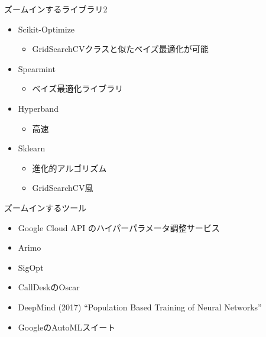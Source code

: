 \documentclass[aspectratio=169, dvipdfmx, 14pt, xcolor={svgnames,dvipsnames}]{beamer}
\def\tightlist{\itemsep1pt\parskip0pt\parsep0pt}
\begin{document}
\begin{frame}{\quad ズームインするライブラリ2}
  \begin{itemize}
    \tightlist
    \item
          Scikit-Optimize

          \begin{itemize}
            \tightlist
            \item
                  GridSearchCVクラスと似たベイズ最適化が可能
          \end{itemize}
    \item
          Spearmint

          \begin{itemize}
            \tightlist
            \item
                  ベイズ最適化ライブラリ
          \end{itemize}
    \item
          Hyperband

          \begin{itemize}
            \tightlist
            \item
                  高速
          \end{itemize}
    \item
          Sklearn

          \begin{itemize}
            \tightlist
            \item
                  進化的アルゴリズム
            \item
                  GridSearchCV風
          \end{itemize}
  \end{itemize}
\end{frame}


\begin{frame}{\quad ズームインするツール}
  \begin{itemize}
    \item
          Google Cloud API のハイパーパラメータ調整サービス
    \item
          Arimo
    \item
          SigOpt
    \item
          CallDeskのOscar
    \item
          DeepMind (2017) ``Population Based Training of Neural Networks''
    \item
          GoogleのAutoMLスイート
  \end{itemize}
\end{frame}
\end{document}
